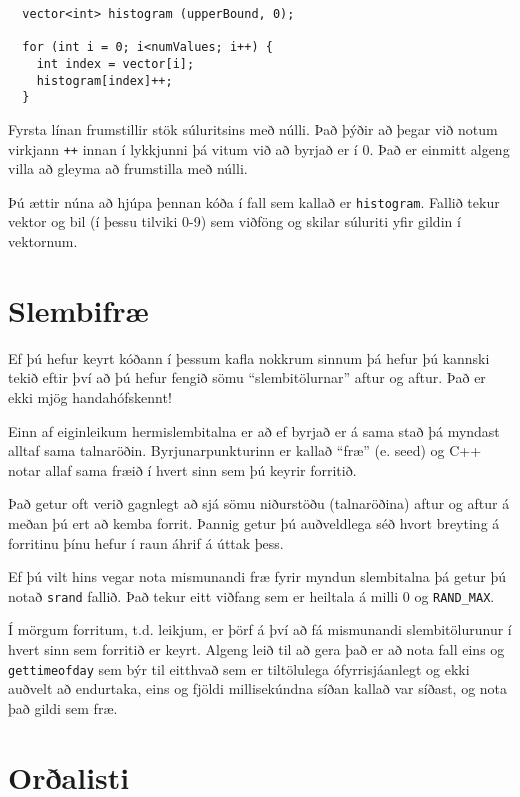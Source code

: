 \begin{verbatim}
  vector<int> histogram (upperBound, 0);

  for (int i = 0; i<numValues; i++) {
    int index = vector[i];
    histogram[index]++;
  }
\end{verbatim}
%
Fyrsta línan frumstillir stök súluritsins með núlli.
Það þýðir að þegar við notum virkjann {\tt ++} innan í lykkjunni þá vitum við að byrjað er í 0.
Það er einmitt algeng villa að gleyma að frumstilla með núlli.

Þú ættir núna að hjúpa þennan kóða í fall sem kallað er {\tt histogram}.
Fallið tekur vektor og bil (í þessu tilviki 0-9) sem viðföng og skilar súluriti yfir gildin í vektornum.

\section{Slembifræ}

Ef þú hefur keyrt kóðann í þessum kafla nokkrum sinnum þá hefur þú kannski tekið eftir því að þú hefur fengið sömu ``slembitölurnar'' aftur og aftur.
Það er ekki mjög handahófskennt!

Einn af eiginleikum hermislembitalna er að ef byrjað er á sama stað þá myndast alltaf sama talnaröðin.
Byrjunarpunkturinn er kallað ``fræ'' (e. seed) og C++ notar allaf sama fræið í hvert sinn sem þú keyrir forritið.

Það getur oft verið gagnlegt að sjá sömu niðurstöðu (talnaröðina) aftur og aftur á meðan þú ert að kemba forrit.
Þannig getur þú auðveldlega séð hvort breyting á forritinu þínu hefur í raun áhrif á úttak þess.

Ef þú vilt hins vegar nota mismunandi fræ fyrir myndun slembitalna þá getur þú notað {\tt srand} fallið.
Það tekur eitt viðfang sem er heiltala á milli 0 og {\tt RAND\_MAX}.

Í mörgum forritum, t.d. leikjum, er þörf á því að fá mismunandi slembitölurunur í hvert sinn sem forritið er keyrt.
Algeng leið til að gera það er að nota fall eins og {\tt gettimeofday} sem býr til eitthvað sem er tiltölulega ófyrrisjáanlegt og ekki auðvelt að endurtaka,
eins og fjöldi millisekúndna síðan kallað var síðast, og nota það gildi sem fræ.

\section{Orðalisti}


